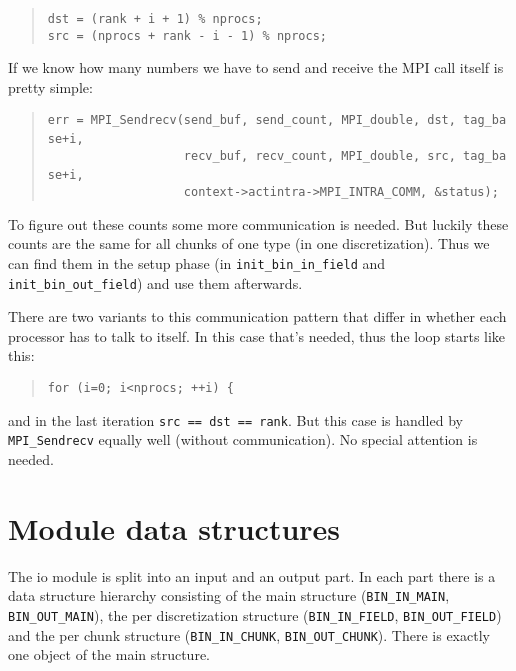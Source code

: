 \begin{quote}
\texttt{dst~=~(rank~+~i~+~1)~{\%}~nprocs;~}~\\
 \texttt{src~=~(nprocs~+~rank~-~i~-~1)~{\%}~nprocs; }
\end{quote}
If we know how many numbers we have to send and receive the MPI call
itself is pretty simple: 

\begin{quote}
\texttt{err~=~MPI{\_}Sendrecv(send{\_}buf,~send{\_}count,~MPI{\_}double,~dst,~tag{\_}base+i,~}~\\
 \texttt{~~~~~~~~~~~~~~~~~~~recv{\_}buf,~recv{\_}count,~MPI{\_}double,~src,~tag{\_}base+i,~}~\\
 \texttt{~~~~~~~~~~~~~~~~~~~context->actintra->MPI{\_}INTRA{\_}COMM,~{\&}status); }
\end{quote}
To figure out these counts some more communication is needed. But
luckily these counts are the same for all chunks of one type (in one
discretization). Thus we can find them in the setup phase (in \texttt{init{\_}bin{\_}in{\_}field}
and \texttt{init{\_}bin{\_}out{\_}field}) and use them afterwards.

There are two variants to this communication pattern that differ in
whether each processor has to talk to itself. In this case that's
needed, thus the loop starts like this: 

\begin{quote}
\texttt{for~(i=0;~i<nprocs;~++i)~{\{} }
\end{quote}
and in the last iteration \texttt{src == dst == rank}. But this case
is handled by \texttt{MPI{\_}Sendrecv} equally well (without communication).
No special attention is needed.


\section{Module data structures}

The io module is split into an input and an output part. In each part
there is a data structure hierarchy consisting of the main structure
(\texttt{BIN{\_}IN{\_}MAIN}, \texttt{BIN{\_}OUT{\_}MAIN}),
the per discretization structure (\texttt{BIN{\_}IN{\_}FIELD},
\texttt{BIN{\_}OUT{\_}FIELD}) and the per chunk structure (\texttt{BIN{\_}IN{\_}CHUNK},
\texttt{BIN{\_}OUT{\_}CHUNK}). There is exactly one object of
the main structure.


